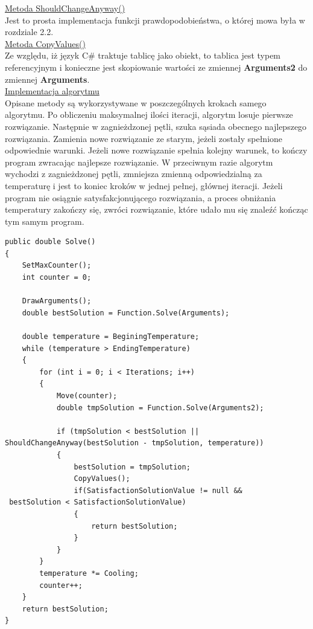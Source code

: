 \documentclass[twoside]{projektInzynierskiMS1}
\newcommand{\si}{ś}
\begin{document}
\underline{Metoda ShouldChangeAnyway()} \\
Jest to prosta implementacja funkcji prawdopodobieństwa, o której mowa była w rozdziale 2.2. \\

\underline{Metoda CopyValues()} \\
Ze względu, iż język C\# traktuje tablicę jako obiekt, to tablica jest typem referencyjnym i konieczne jest skopiowanie warto\si ci ze zmiennej \textbf{Arguments2} do zmiennej \textbf{Arguments}. \\

\underline{Implementacja algorytmu} \\
Opisane metody są wykorzystywane w poszczególnych krokach samego algorytmu. Po obliczeniu maksymalnej ilo\si ci iteracji, algorytm losuje pierwsze rozwiązanie. Następnie w zagnieżdzonej pętli, szuka sąsiada obecnego najlepszego rozwiązania. Zamienia nowe rozwiązanie ze starym, jeżeli zostały spełnione odpowiednie warunki. Jeżeli nowe rozwiązanie spełnia kolejny warunek, to kończy program zwracając najlepsze rozwiązanie. W przeciwnym razie algorytm wychodzi z zagnieżdzonej pętli, zmniejsza zmienną odpowiedzialną za temperaturę i jest to koniec kroków w jednej pełnej, głównej iteracji. Jeżeli program nie osiągnie satysfakcjonującego rozwiązania, a proces obniżania temperatury zakończy się, zwróci rozwiązanie, które udało mu się znaleźć kończąc tym samym program.

\begin{verbatim}
public double Solve()
{
    SetMaxCounter();
    int counter = 0;

    DrawArguments();
    double bestSolution = Function.Solve(Arguments);

    double temperature = BeginingTemperature;
    while (temperature > EndingTemperature)
    {
        for (int i = 0; i < Iterations; i++)
        {
            Move(counter);
            double tmpSolution = Function.Solve(Arguments2);

            if (tmpSolution < bestSolution || 
ShouldChangeAnyway(bestSolution - tmpSolution, temperature))
            {
                bestSolution = tmpSolution;
                CopyValues();
                if(SatisfactionSolutionValue != null &&
 bestSolution < SatisfactionSolutionValue)
                {
                    return bestSolution;
                }
            }
        }
        temperature *= Cooling;
        counter++;
    }
    return bestSolution;
}
\end{verbatim}
\end{document}
